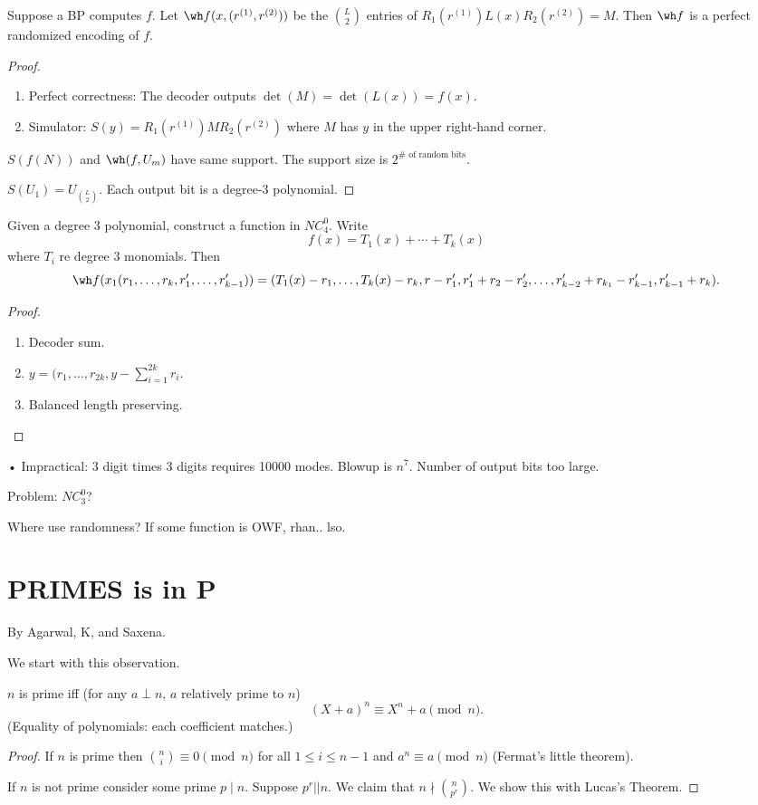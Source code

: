 \begin{enumerate}
\begin{lem}
Suppose a BP computes $f$. Let $\wh f(x,(r^{(1)}, r^{(2)}))$ be the $\binom L2$ entries of $R_1(r^{(1)})L(x)R_2(r^{(2)})=M$. Then $\wh f$ is a perfect randomized encoding of $f$. 
\end{lem} 
\begin{proof}
\begin{enumerate}
\item
Perfect correctness: The decoder outputs $\det(M)=\det(L(x))=f(x)$. 
\item
Simulator: $S(y) = R_1(r^{(1)})MR_2(r^{(2)})$ where $M$ has $y$ in the upper right-hand corner.
\end{enumerate}
$S(f(N))$ and $\wh (f,U_m)$ have same support.
The support size is $2^{\#\text{ of random bits}}$.
\item $S(U_1)=U_{\binom L2}$.
Each output bit is a degree-3 polynomial.
\end{proof}
\item Given a degree 3 polynomial, construct a function in $NC_4^0$. 
Write
\[
f(x)=T_1(x)+\cdots +T_k(x)
\]
where $T_i$ re degree 3 monomials. Then 
\[
\wh f(x_1(r_1,\ldots, r_k, r_1',\ldots, r_{k-1}'))= (T_1(x)-r_1,\ldots, T_k(x)-r_k, r-r_1',r_1'+r_2-r_2', \ldots, r_{k-2}' + r_{k_1}
- r_{k-1}', r_{k-1}'+r_k).
\]
\begin{proof}
\begin{enumerate}
\item
Decoder sum.
\item
$y=(r_1,\ldots, r_{2k}, y-\sum_{i=1}^{2k} r_i$.
\item Balanced length preserving.
\end{enumerate}
\end{proof}
\end{enumerate}•
Impractical: 3 digit times 3 digits requires 10000 modes. Blowup is $n^7$. Number of output bits too large.

Problem: $NC_3^0$?

Where use randomness? If some function is OWF, rhan.. lso.

\section{PRIMES is in P}

By Agarwal, K, and Saxena.

We start with this observation.
\begin{thm}
$n$ is prime iff (for any $a\perp n$, $a$ relatively prime to $n$)
\[
(X+a)^n\equiv X^n+a\pmod n.
\]
(Equality of polynomials: each coefficient matches.)
\end{thm}
\begin{proof}
If $n$ is prime then $\binom ni\equiv 0\pmod n$ for all $1\le i\le n-1$ and $a^n\equiv a\pmod n$ (Fermat's little theorem).

If $n$ is not prime consider some prime $p\mid n$. Suppose $p^r||n$. We claim that $n\nmid \binom{n}{p^r}$. We show this with Lucas's Theorem.
\end{proof}

